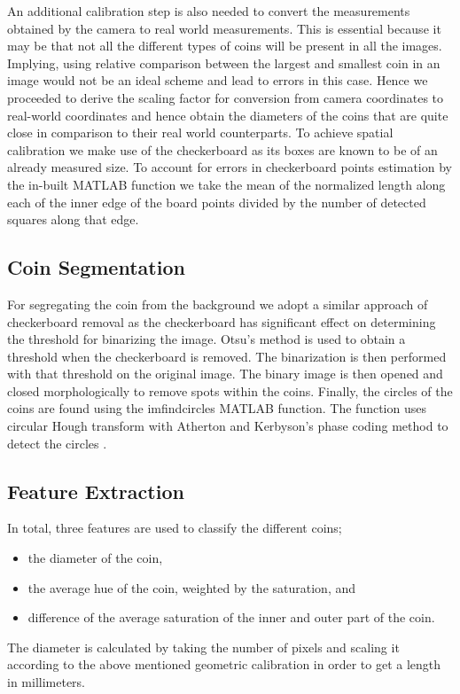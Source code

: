 \documentclass[report.tex]{subfile}
\begin{document}
An additional calibration step is also needed to convert the measurements
obtained by the camera to real world measurements. This is essential because it
may be that not all the different types of coins will be present in all the
images. Implying, using relative comparison between the largest and smallest
coin in an image would not be an ideal scheme and lead to errors in this case.
Hence we proceeded to derive the scaling factor for conversion from camera
coordinates to real-world coordinates and hence obtain the diameters of the
coins that are quite close in comparison to their real world counterparts. To
achieve spatial calibration we make use of the checkerboard as its boxes are
known to be of an already measured size. To account for errors in checkerboard
points estimation by the in-built MATLAB function we take the mean of the
normalized length along each of the inner edge of the board points divided by
the number of detected squares along that edge.

\subsection{Coin Segmentation}
For segregating the coin from the background we adopt a similar approach of
checkerboard removal as the checkerboard has significant effect on determining
the threshold for binarizing the image. Otsu's method is used to obtain a
threshold when the checkerboard is removed. The binarization is then performed
with that threshold on the original image. The binary image is then opened and
closed morphologically to remove spots within the coins. Finally, the circles
of the coins are found using the imfindcircles MATLAB function. The function
uses circular Hough transform with Atherton and Kerbyson's phase coding method
to detect the circles \cite{matlab-imfindcircles}.

\subsection{Feature Extraction}
In total, three features are used to classify the different coins;
\begin{itemize}
    \item the diameter of the coin,
    \item the average hue of the coin, weighted by the saturation, and
    \item difference of the average saturation of the inner and outer part of
        the coin.
\end{itemize}
The diameter is calculated by taking the number of pixels and scaling it
according to the above mentioned geometric calibration in order to get a length
in millimeters.
\end{document}
